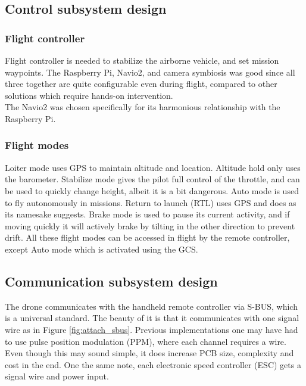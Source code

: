 \subsection{Control subsystem design}

\subsubsection{Flight controller}
Flight controller is needed to stabilize the airborne vehicle, and set mission waypoints. The Raspberry Pi, Navio2, and camera symbiosis was good since all three together are quite configurable even during flight, compared to other solutions which require hands-on intervention.\\

The Navio2 was chosen specifically for its harmonious relationship with the Raspberry Pi.

\subsubsection{Flight modes}

Loiter mode uses GPS to maintain altitude and location. Altitude hold only uses the barometer. Stabilize mode gives the pilot full control of the throttle, and can be used to quickly change height, albeit it is a bit dangerous. Auto mode is used to fly autonomously in missions. Return to launch (RTL) uses GPS and does as its namesake suggests. Brake mode is used to pause its current activity, and if moving quickly it will actively brake by tilting in the other direction to prevent drift. All these flight modes can be accessed in flight by the remote controller, except Auto mode which is activated using the GCS.

\subsection{Communication subsystem design}
\label{sec:comms}

The drone communicates with the handheld remote controller via S-BUS, which is a universal standard. The beauty of it is that it communicates with one signal wire as in Figure \ref{fig:attach_sbus}. Previous implementations one may have had to use pulse position modulation (PPM), where each channel requires a wire. Even though this may sound simple, it does increase PCB size, complexity and cost in the end. One the same note, each electronic speed controller (ESC) gets a signal wire and power input.

